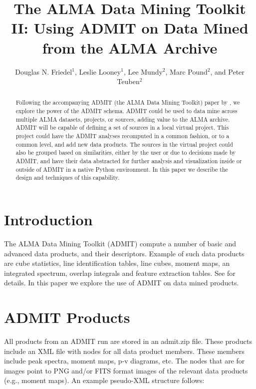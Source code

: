 \documentclass[11pt,twoside]{article}
\begin{document}
\title{The ALMA Data Mining Toolkit II: Using ADMIT on Data Mined from the ALMA Archive}
\author{Douglas N. Friedel$^1$, Leslie Looney$^1$, Lee Mundy$^2$, Marc Pound$^2$, and Peter Teuben$^2$
}

\begin{abstract}
Following the accompanying ADMIT (the ALMA Data Mining Toolkit) paper by \citet{teuben_adassxxiii}, we explore the power of the ADMIT schema. ADMIT could be used to data mine across multiple ALMA datasets, projects, or sources, adding value to the ALMA archive. ADMIT will be capable of defining a set of sources in a local virtual project. This project could have the ADMIT analyses recomputed in a common fashion, or to a common level, and add new data products. The sources in the virtual project could also be grouped based on similarities, either by the user or due to decisions made by ADMIT, and have their data abstracted for further analysis and visualization inside or outside of ADMIT in a native Python environment. In this paper we describe the design and techniques of this capability. 
\end{abstract}

\section{Introduction}
The ALMA Data Mining Toolkit (ADMIT) compute a number of basic and advanced data products, and their descriptors. Example of such data products are cube statistics, line identification tables, line cubes, moment maps, an integrated spectrum, overlap integrals and feature extraction tables. See \citet{teuben_adassxxiii} for details. In this paper we explore the use of ADMIT on data mined products.

\section{ADMIT Products}
All products from an ADMIT run are stored in an admit.zip file. These products include an XML file with nodes for all data product members. These members include peak spectra, moment maps, p-v diagrams, etc. The nodes that are for images point to PNG and/or FITS format images of the relevant data products (e.g., moment maps). An example pseudo-XML structure follows:
\end{document}
